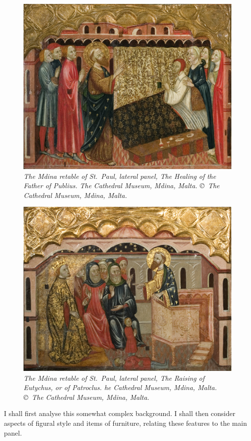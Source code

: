 \documentclass[a4paper,12pt]{article}
\begin{document}
\begin{figure}[htbp]
\centering
\includegraphics[width=14cm]{pics/fig7.png}
\caption[The Mdina retable of St.~Paul, lateral panel, The Healing of the
Father of Publius]
{\it The Mdina retable of St.~Paul, lateral panel, The Healing of the
Father of Publius.  
The Cathedral Museum, Mdina, Malta. \copyright\ The Cathedral Museum,
  Mdina, Malta.} 
\end{figure}
\begin{figure}[htbp]
\centering
\includegraphics[width=14cm]{pics/fig8.png}
\caption[The Mdina retable of St.~Paul, lateral panel, The Raising
  of Eutychus, or of Patroclus]
{\it The Mdina retable of St.~Paul, lateral panel, The Raising
  of Eutychus, or of Patroclus.  
he Cathedral Museum, Mdina, Malta. \copyright\ The Cathedral Museum,
  Mdina, Malta.} 
\end{figure}
I shall first analyse this somewhat complex background.  I shall then
consider aspects of figural style and items of furniture, relating
these features to the main panel.
\end{document}
